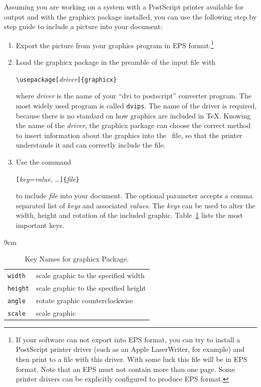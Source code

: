 \newpage
Assuming you are working on a system with a
PostScript printer available for output and with the \textsf{graphicx}
package installed, you can use the following step by step guide to
include a picture into your document:

\begin{enumerate}
\item Export the picture from your graphics program in EPS
  format.\footnote{If your software can not export into EPS format, you
    can try to install a PostScript printer driver (such as an Apple
    LaserWriter, for example) and then print to a file with this
    driver. With some luck this file will be in EPS format. Note that
    an EPS must not contain more than one page. Some printer drivers
    can be explicitly configured to produce EPS format.}
\item Load the \textsf{graphicx} package in the preamble of the input
  file with
\begin{lscommand}
\verb|\usepackage[|\emph{driver}\verb|]{graphicx}|
\end{lscommand}
where \emph{driver} is the name of your ``dvi to postscript''
converter program. The most
widely used program is called \texttt{dvips}. The name of the driver is
required, because there is no standard on how graphics are included in
\TeX{}. Knowing the name of the \emph{driver}, the
\textsf{graphicx} package can choose the correct method to insert
information about the graphics into the ~file, so that the
printer understands it and can correctly include the  file.
\item Use the command 
\begin{lscommand}
\verb|[|\emph{key}=\emph{value}, \ldots\verb|]{|\emph{file}\verb|}|
\end{lscommand}
to include \emph{file} into your document. The optional parameter
accepts a comma separated list of \emph{keys} and associated
\emph{values}. The \emph{keys} can be used to alter the width, height
and rotation of the included graphic. Table~\ref{keyvals} lists the
most important keys.
\end{enumerate}

\begin{table}[htb]
\caption{Key Names for \textsf{graphicx} Package.}
\label{keyvals}
\begin{lined}{9cm}
\begin{tabular}{@{}ll}
\texttt{width}& scale graphic to the specified width\\
\texttt{height}& scale graphic to the specified height\\
\texttt{angle}& rotate graphic counterclockwise\\
\texttt{scale}& scale graphic \\
\end{tabular}

\bigskip
\end{lined}
\end{table}

